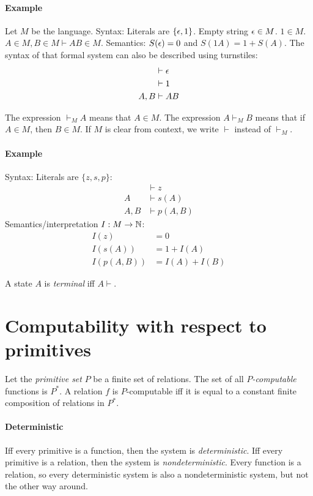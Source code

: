 \paragraph{Example}
Let \(M\) be the language.
Syntax:
Literals are \(\{\epsilon, 1\}\).
Empty string \(\epsilon \in M\).
\(1 \in M\).
\(A \in M, B \in M \vdash AB \in M\).
Semantics: \(S(\epsilon) = 0\) and \(S(1A) = 1 + S(A)\).
The syntax of that formal system can also be described using turnstiles:
\begin{align*}
    &\vdash \epsilon
    \\
    &\vdash 1
    \\
    A,B &\vdash AB
\end{align*}

The expression \(\vdash_M A\) means that \(A \in M\).
The expression \(A \vdash_M B\) means that if \(A \in M\), then \(B \in M\).
If \(M\) is clear from context, we write \(\vdash\) instead of \(\vdash_M\).

\paragraph{Example}
Syntax:
Literals are \(\{z,s,p\}\):
\begin{align*}
    &\vdash z
    \\
    A &\vdash s(A)
    \\
    A,B &\vdash p(A,B)
\end{align*}
Semantics/interpretation \(I : M \to \mathbb{N}\):
\begin{align*}
    I(z) &= 0
    \\
    I(s(A)) &= 1 + I(A)
    \\
    I(p(A,B)) &= I(A) + I(B)
\end{align*}

A state \(A\) is \emph{terminal} iff \(A \vdash\).

\section{Computability with respect to primitives}

Let the \emph{primitive set} \(P\) be a finite set of relations.
The set of all \emph{\(P\)-computable} functions is \(P^*\).
A relation \(f\) is \(P\)-computable iff it is equal to
a constant finite composition of relations in \(P^*\).

\paragraph{Deterministic}
Iff every primitive is a function,
then the system is \emph{deterministic}.
Iff every primitive is a relation,
then the system is \emph{nondeterministic}.
Every function is a relation,
so every deterministic system is also a nondeterministic system,
but not the other way around.


